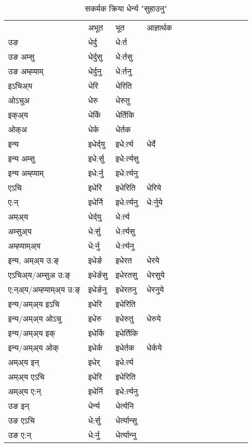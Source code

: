\begin{table}[H]
\centering
\caption{\label{ert.vt} सकर्मक क्रिया  धेर्न्य  "सुहाउनु"  }
\begin{tabular}{l|l|l|l|l|l|l|l|l|l|l|l|l}  \toprule
&अभूत & भूत & आज्ञार्थक \\ 
उङ &धेर्दु &धे:र्त \\ 
उङ अम्सु&धेर्दुसु &धे:र्तसु \\ 
उङ अम्ह्‍याम्&धेर्दुनु &धे:र्तनु \\ 
इऽचिअ्य &धेरि &धेरिति   \\ 
ओऽचुअ        &धेरु &धेरुतु   \\ 
इक्अ्य&धेर्कि &धेर्तिकि   \\ 
ओक्अ &धेर्क &धेर्तक   \\ 
इन्य & इधेर्द्‌यु  & इधे:र्त्य &धेर्दे  \\ 
इन्य अम्सु& इधे:र्सु  & इधे:र्त्यसु   \\ 
इन्य अम्ह्‍याम्& इधे:र्नु  & इधे:र्त्यनु   \\ 
एऽचि & इधेरि & इधेरिति &धेरिये    \\ 
ए:न् & इधेर्नि  & इधे:र्त्यनु &धे:र्नुये  \\ 
अम्अ्य & धेर्द्‌यु  & धे:र्त्य  \\ 
अम्सुअ्य & धे:र्सु & धे:र्त्यसु  \\ 
अम्ह्‍याम्अ्य & धे:र्नु  & धे:र्त्यनु \\ 
\midrule
इन्य, अम्अ्य उ:ङ्‌ &इधेर्ङ &इधेरत &धेरये \\ 
एऽचिअ्य/अम्सुअ उ:ङ्‌ &इधेर्ङसु &इधेरतसु &धेरसुये \\ 
ए:न्अ्य/अम्ह्‍याम्अ्य उ:ङ्‌ &इधेर्ङनु &इधेरतनु &धेरनुये \\ 
इन्य/अम्अ्य इऽचि &इधेरि &इधेरिति    \\ 
इन्य/अम्अ्य ओऽचु &इधेरु &इधेरुतु  &धेरुये  \\ 
इन्य/अम्अ्य इक् &इधेर्कि &इधेर्तिकि   \\ 
इन्य/अम्अ्य ओक् &इधेर्क &इधेर्तक  &धेर्कये  \\ 
अम्अ्य इन् & इधेर् & इधे:र्त्य   \\ 
अम्अ्य एऽचि & इधेरि & इधेरिति    \\ 
अम्अ्य ए:न् & इधेर्नि  & इधे:र्त्यनु  \\ 
\midrule
उङ इन् & धेर्न्य  & धेर्त्यनि  \\ 
उङ एऽचि & धे:र्सु  & धेर्त्यान्सु   \\ 
उङ ए:न्& धे:र्नु  & धेर्त्यान्‍नु   \\ 
\bottomrule
\end{tabular}
\end{table}



